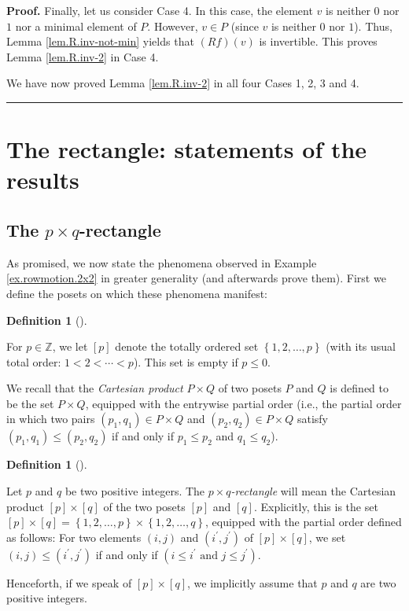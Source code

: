 \documentclass[numbers=enddot,12pt,final,onecolumn,notitlepage]{scrartcl}%
\theoremstyle{definition}
\newtheorem{defi}[theo]{Definition}
\newenvironment{definition}[1][]
{\begin{defi}[#1]\begin{leftbar}}
{\end{leftbar}\end{defi}}
\newenvironment{verlong}{}{}
\newenvironment{proof}[1][Proof]{\noindent\textbf{#1.} }{\ \rule{0.5em}{0.5em}}
\begin{document}
\begin{verlong}
\begin{proof}
Finally, let us consider Case 4. In this case, the element $v$ is neither $0$
nor $1$ nor a minimal element of $P$. However, $v\in P$ (since $v$ is neither
$0$ nor $1$). Thus, Lemma \ref{lem.R.inv-not-min} yields that $\left(
Rf\right)  \left(  v\right)  $ is invertible. This proves Lemma
\ref{lem.R.inv-2} in Case 4.

We have now proved Lemma \ref{lem.R.inv-2} in all four Cases 1, 2, 3 and 4.
\end{proof}
\end{verlong}

\section{\label{sec.rect}The rectangle: statements of the results}

\subsection{The $p\times q$-rectangle}

As promised, we now state the phenomena observed in Example
\ref{ex.rowmotion.2x2} in greater generality (and afterwards prove them).
First we define the posets on which these phenomena manifest:

\begin{definition}
For $p\in\mathbb{Z}$, we let $\left[  p\right]  $ denote the totally ordered
set $\left\{  1,2,\ldots,p\right\}  $ (with its usual total order:
$1<2<\cdots<p$). This set is empty if $p\leq0$.
\end{definition}

\begin{verlong}
We recall that the \emph{Cartesian product} $P\times Q$ of two posets $P$ and
$Q$ is defined to be the set $P\times Q$, equipped with the entrywise partial
order (i.e., the partial order in which two pairs $\left(  p_{1},q_{1}\right)
\in P\times Q$ and $\left(  p_{2},q_{2}\right)  \in P\times Q$ satisfy
$\left(  p_{1},q_{1}\right)  \leq\left(  p_{2},q_{2}\right)  $ if and only if
$p_{1}\leq p_{2}$ and $q_{1}\leq q_{2}$).
\end{verlong}

\begin{definition}
\label{def.rect}Let $p$ and $q$ be two positive integers. The $p\times
q$\emph{-rectangle} will mean the Cartesian product $\left[  p\right]
\times\left[  q\right]  $ of the two posets $\left[  p\right]  $ and $\left[
q\right]  $. Explicitly, this is the set $\left[  p\right]  \times\left[
q\right]  =\left\{  1,2,\ldots,p\right\}  \times\left\{  1,2,\ldots,q\right\}
$, equipped with the partial order defined as follows: For two elements
$\left(  i,j\right)  $ and $\left(  i^{\prime},j^{\prime}\right)  $ of
$\left[  p\right]  \times\left[  q\right]  $, we set $\left(  i,j\right)
\leq\left(  i^{\prime},j^{\prime}\right)  $ if and only if $\left(  i\leq
i^{\prime}\text{ and }j\leq j^{\prime}\right)  $.

Henceforth, if we speak of $\left[  p\right]  \times\left[  q\right]  $, we
implicitly assume that $p$ and $q$ are two positive integers.
\end{definition}
\end{document}

